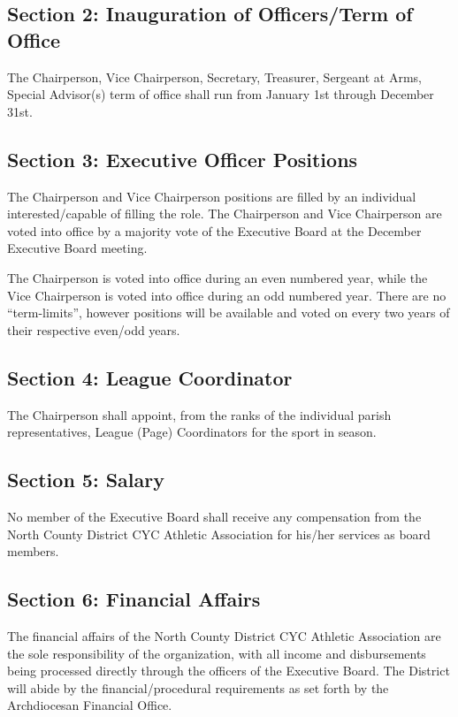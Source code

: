 \documentclass[letteraper,10pt,oneside,draft]{memoir}
\begin{document}
\subsection{Section 2: Inauguration of Officers/Term of Office}
\label{ssec:const-4-2}
The Chairperson, Vice Chairperson, Secretary, Treasurer, Sergeant at Arms, Special Advisor(s) term of office shall run from January 1st through December 31st.  

\subsection{Section 3: Executive Officer Positions}
\label{ssec:const-4-3}
The Chairperson and Vice Chairperson positions are filled by an individual interested/capable of filling the role. The Chairperson and Vice Chairperson are voted into office by a majority vote of the Executive Board at the December Executive Board meeting.

The Chairperson is voted into office during an even numbered year, while the Vice Chairperson is voted into office during an odd numbered year. There are no “term-limits”, however positions will be available and voted on every two years of their respective even/odd years.

\subsection{Section 4: League Coordinator}
\label{ssec:const-4-4}
The Chairperson shall appoint, from the ranks of the individual parish representatives, League (Page) Coordinators for the sport in season.

\subsection{Section 5: Salary}
\label{ssec:const-4-5}
No member of the Executive Board shall receive any compensation from the North County District CYC Athletic Association for his/her services as board members.

\subsection{Section 6: Financial Affairs}
\label{ssec:const-4-6}
The financial affairs of the North County District CYC Athletic Association are the sole responsibility of the organization, with all income and disbursements being processed directly through the officers of the Executive Board.  The District will abide by the financial/procedural requirements as set forth by the Archdiocesan Financial Office.
\end{document}
